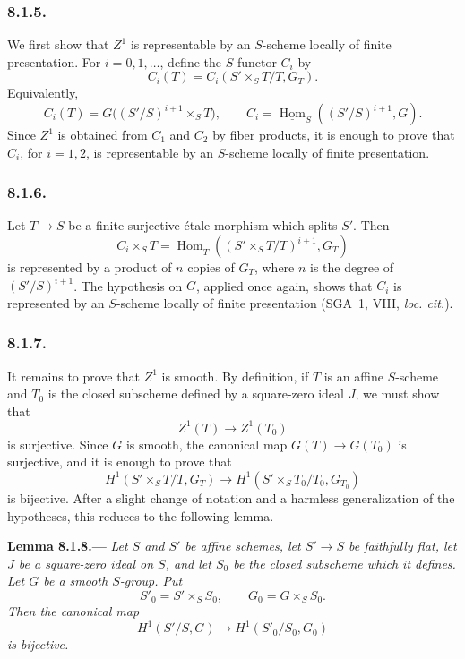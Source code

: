 \subsubsection*{8.1.5.}

We first show that \(Z^1\) is representable by an \(S\)-scheme locally
of finite presentation. For \(i=0,1,\ldots\), define the \(S\)-functor
\(C_i\) by
\[
  C_i(T)=C_i(S'\times_ST/T,G_T).
\]
Equivalently,
\[
  C_i(T)
  =
  G\bigl((S'/S)^{i+1}\times_ST\bigr),
  \qquad
  C_i
  =
  \underline{\operatorname{Hom}}_S((S'/S)^{i+1},G).
\]
Since \(Z^1\) is obtained from \(C_1\) and \(C_2\) by fiber products,
it is enough to prove that \(C_i\), for \(i=1,2\), is representable by
an \(S\)-scheme locally of finite presentation.

\subsubsection*{8.1.6.}

Let \(T\to S\) be a finite surjective étale morphism which splits
\(S'\). Then
\[
  C_i\times_ST
  =
  \underline{\operatorname{Hom}}_T
    ((S'\times_ST/T)^{i+1},G_T)
\]
is represented by a product of \(n\) copies of \(G_T\), where \(n\)
is the degree of \((S'/S)^{i+1}\). The hypothesis on \(G\), applied
once again, shows that \(C_i\) is represented by an \(S\)-scheme
locally of finite presentation (SGA~1, VIII, \textit{loc. cit.}).

\subsubsection*{8.1.7.}

It remains to prove that \(Z^1\) is smooth. By definition, if \(T\) is
an affine \(S\)-scheme and \(T_0\) is the closed subscheme defined by
a square-zero ideal \(J\), we must show that
\[
  Z^1(T)\longrightarrow Z^1(T_0)
\]
is surjective. Since \(G\) is smooth, the canonical map
\(G(T)\to G(T_0)\) is surjective, and it is enough to prove that
\[
  H^1(S'\times_ST/T,G_T)
  \longrightarrow
  H^1(S'\times_ST_0/T_0,G_{T_0})
\]
is bijective. After a slight change of notation and a harmless
generalization of the hypotheses, this reduces to the following
lemma.

\par\medskip\noindent{}\textbf{Lemma 8.1.8.---}\enspace
\emph{Let \(S\) and \(S'\) be affine schemes, let \(S'\to S\) be
faithfully flat, let \(J\) be a square-zero ideal on \(S\), and let
\(S_0\) be the closed subscheme which it defines. Let \(G\) be a
smooth \(S\)-group. Put
\[
  S'_0=S'\times_SS_0,
  \qquad
  G_0=G\times_SS_0.
\]
Then the canonical map
\[
  H^1(S'/S,G)\longrightarrow H^1(S'_0/S_0,G_0)
\]
is bijective.}

